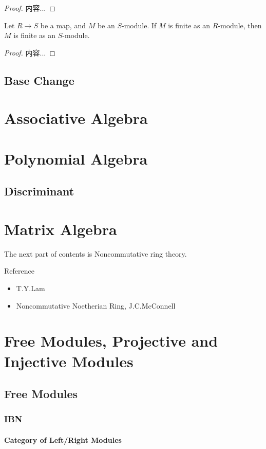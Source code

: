 \documentclass[Total.tex]{subfiles}
\begin{document}
			\begin{proof}
				内容...
			\end{proof}
			
			\begin{lemma}
				Let $R\rightarrow S$ be a map, and $M$ be an $S$-module. If $M$ is finite as an $R$-module, then $M$ is finite as an $S$-module.	
			\end{lemma}
			
			\begin{proof}
				内容...
			\end{proof}
		\section{Base Change}
	\chapter{Associative Algebra}
	
	\chapter{Polynomial Algebra}
		\section{Discriminant }
	\chapter{Matrix Algebra}
	
	\newpage The next part of contents is Noncommutative ring theory.
	
	
	Reference
	\begin{itemize}
		\item T.Y.Lam
		\item Noncommutative Noetherian Ring, J.C.McConnell
	\end{itemize}
	\chapter{Free Modules, Projective and Injective Modules}
	\section{Free Modules}
	\subsection{IBN}
	\subsubsection{Category of Left/Right Modules}
	
\end{document}
